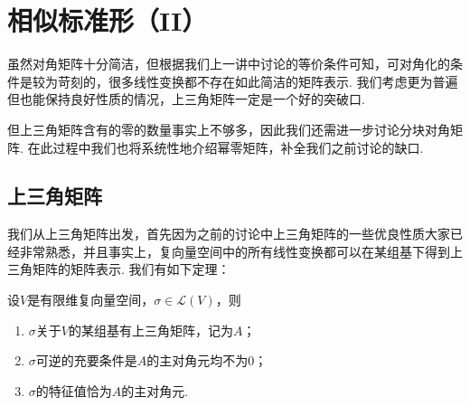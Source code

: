 \chapter{相似标准形（II）}

虽然对角矩阵十分简洁，但根据我们上一讲中讨论的等价条件可知，可对角化的条件是较为苛刻的，很多线性变换都不存在如此简洁的矩阵表示. 我们考虑更为普遍但也能保持良好性质的情况，上三角矩阵一定是一个好的突破口.

但上三角矩阵含有的零的数量事实上不够多，因此我们还需进一步讨论分块对角矩阵. 在此过程中我们也将系统性地介绍幂零矩阵，补全我们之前讨论的缺口.

\section{上三角矩阵}

我们从上三角矩阵出发，首先因为之前的讨论中上三角矩阵的一些优良性质大家已经非常熟悉，并且事实上，复向量空间中的所有线性变换都可以在某组基下得到上三角矩阵的矩阵表示. 我们有如下定理：
\begin{theorem}\label{thm:20:上三角矩阵存在}
    设$V$是有限维复向量空间，$\sigma\in \mathcal{L}(V)$，则
    \begin{enumerate}
        \item $\sigma$关于$V$的某组基有上三角矩阵，记为$A$；

        \item $\sigma$可逆的充要条件是$A$的主对角元均不为0；

        \item $\sigma$的特征值恰为$A$的主对角元.
    \end{enumerate}
\end{theorem}

